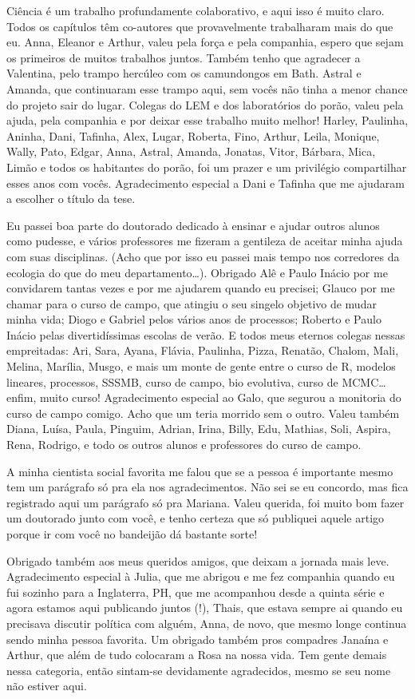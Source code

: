 Ciência é um trabalho profundamente colaborativo, e aqui isso é muito claro. Todos os capítulos têm co-autores que provavelmente trabalharam mais do que eu. Anna, Eleanor e Arthur, valeu pela força e pela companhia, espero que sejam os primeiros de muitos trabalhos juntos. Também tenho que agradecer a Valentina, pelo trampo hercúleo com os camundongos em Bath. Astral e Amanda, que continuaram esse trampo aqui, sem vocês não tinha a menor chance do projeto sair do lugar. Colegas do LEM e dos laboratórios do porão, valeu pela ajuda, pela companhia e por deixar esse trabalho muito melhor! Harley, Paulinha, Aninha, Dani, Tafinha, Alex, Lugar, Roberta, Fino,
Arthur, Leila, Monique, Wally, Pato, Edgar, Anna, Astral, Amanda, Jonatas, Vitor, Bárbara, Mica, Limão e todos os habitantes do porão, foi um prazer e um privilégio compartilhar esses anos com vocês. Agradecimento especial a Dani e Tafinha que me ajudaram a escolher o título da tese.

Eu passei boa parte do doutorado dedicado à ensinar e ajudar outros alunos como pudesse, e vários professores me fizeram a gentileza de aceitar minha ajuda com suas disciplinas. (Acho que por isso eu passei mais tempo nos corredores da ecologia do que do meu departamento…). Obrigado Alê e Paulo Inácio por me convidarem tantas vezes e por me ajudarem quando eu precisei; Glauco por me chamar para o curso de campo, que atingiu o seu singelo objetivo de mudar minha vida; Diogo e Gabriel pelos vários anos de processos; Roberto e Paulo Inácio pelas divertidíssimas escolas de verão. E todos meus eternos colegas nessas empreitadas: Ari, Sara, Ayana, Flávia, Paulinha, Pizza, Renatão, Chalom, Mali, Melina, Marília, Musgo, e mais um monte de gente entre o curso de R, modelos lineares, processos, SSSMB, curso de campo, bio evolutiva, curso de MCMC… enfim, muito curso! Agradecimento especial ao Galo, que segurou a monitoria do curso de campo comigo. Acho que um teria morrido sem o outro. Valeu também Diana, Luísa, Paula, Pinguim, Adrian, Irina, Billy, Edu, Mathias, Soli, Aspira, Rena, Rodrigo, e todo os outros alunos e professores do curso de campo.

A minha cientista social favorita me falou que se a pessoa é importante mesmo tem um parágrafo só pra ela nos agradecimentos. Não sei se eu concordo, mas fica registrado aqui um parágrafo só pra Mariana. Valeu querida, foi muito bom fazer um doutorado junto com você, e tenho certeza que só publiquei aquele artigo porque ir com você no bandeijão dá bastante sorte!

Obrigado também aos meus queridos amigos, que deixam a jornada mais leve. Agradecimento especial à Julia, que me abrigou e me fez companhia quando eu fui sozinho para a Inglaterra, PH, que me acompanhou desde a quinta série e agora estamos aqui publicando juntos (!), Thais, que estava sempre ai quando eu precisava discutir política com alguém, Anna, de novo, que mesmo longe continua sendo minha pessoa favorita. Um obrigado também pros compadres Janaína e Arthur, que além de tudo colocaram a Rosa na nossa vida. Tem gente demais nessa categoria, então sintam-se devidamente agradecidos, mesmo se seu nome não estiver aqui. 

